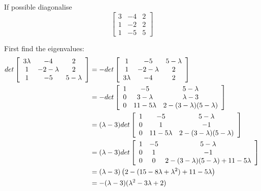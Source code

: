 \documentclass{article}
\begin{document}
\begin{Exercise}
  If possible diagonalise
  \begin{equation*}
  \left[
  \begin{array}{ccc}
  3&-4&2\\
  1&-2&2\\
  1&-5&5
  \end{array}
  \right]
  \end{equation*}
\end{Exercise}

\begin{Answer}
  First find the eigenvalues:
  \begin{align*}
    det \left[
    \begin{array}{ccc}
    3\-\lambda & -4 & 2\\
    1& -2-\lambda & 2\\
    1 & -5 & 5-\lambda
    \end{array}
    \right] &= -det \left[
    \begin{array}{ccc}
    1 & -5 & 5-\lambda\\
    1& -2-\lambda & 2\\
    3\-\lambda & -4 & 2
    \end{array}
    \right] \\
    &= -det \left[
    \begin{array}{ccc}
    1 & -5 & 5-\lambda\\
    0& 3-\lambda & \lambda-3\\
    0 & 11-5\lambda & 2-(3-\lambda)(5-\lambda)
    \end{array}
    \right]\\
    &= (\lambda-3)det \left[
    \begin{array}{ccc}
    1 & -5 & 5-\lambda\\
    0& 1 & -1\\
    0 & 11-5\lambda & 2-(3-\lambda)(5-\lambda)
    \end{array}
    \right]\\
    &= (\lambda-3)det \left[
    \begin{array}{ccc}
    1 & -5 & 5-\lambda\\
    0& 1 & -1\\
    0 & 0 & 2-(3-\lambda)(5-\lambda)+11-5\lambda
    \end{array}
    \right] \\
    &= (\lambda -3)\left(2-(15-8\lambda +\lambda^2)+11-5\lambda\right)\\
    &= -(\lambda -3)(\lambda^2-3\lambda +2)\\

\end{align*}
\end{Answer}
\end{document}
